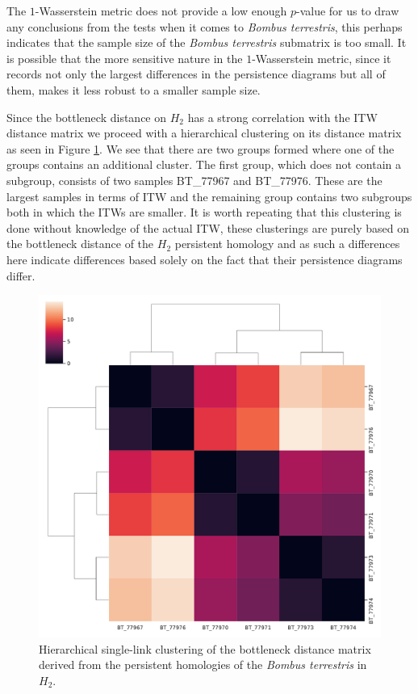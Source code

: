 The $1$-Wasserstein metric does not provide a low enough $p$-value for us to draw any conclusions from the tests when it comes to \textit{Bombus terrestris}, this perhaps indicates that the sample size of the \textit{Bombus terrestris} submatrix is too small. It is possible that the more sensitive nature in the $1$-Wasserstein metric, since it records not only the largest differences in the persistence diagrams but all of them, makes it less robust to a smaller sample size.

Since the bottleneck distance on $H_{2}$ has a strong correlation with the ITW distance matrix we proceed with a hierarchical clustering on its distance matrix as seen in Figure \ref{h2b}. We see that there are two groups formed where one of the groups contains an additional cluster. The first group, which does not contain a subgroup, consists of two samples BT\_77967 and BT\_77976. These are the largest samples in terms of ITW and the remaining group contains two subgroups both in which the ITWs are smaller. It is worth repeating that this clustering is done without knowledge of the actual ITW, these clusterings are purely based on the bottleneck distance of the $H_{2}$ persistent homology and as such a differences here indicate differences based solely on the fact that their persistence diagrams differ.

\begin{figure}[ht]
  \centering
  \includegraphics[scale=0.35]{clusters/bottleneck_h2_cluster.pdf}
  \caption{\label{h2b} Hierarchical single-link clustering of the bottleneck distance matrix derived from the persistent homologies of the \textit{Bombus terrestris} in $H_{2}$.}
\end{figure}

